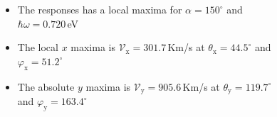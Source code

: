 \documentclass{beamer}
\begin{document}
\begin{frame}
\begin{columns}
{\begin{itemize}
\item The responses has a local maxima for $\alpha = 150^{\circ}$ and $\hbar
\omega = 0.720$\,eV

\item The local $x$ maxima is 
$\mathcal{V}_{\mathrm{x}} = 301.7 $\,Km/s at
$\theta_{\mathrm{x}} = 44.5^{\circ}$ and
$\varphi_{\mathrm{x}} = 51.2^{\circ}$

\item The absolute $y$ maxima is 
$\mathcal{V}_{\mathrm{y}} = 905.6$\,Km/s at 
$\theta_{\mathrm{y}} = 119.7^{\circ}$ and
$\varphi_{\mathrm{y}} = 163.4^{\circ}$

\end{itemize}

}

\begin{center}

\vspace{-8mm}
\begin{figure}[h!]
\end{figure}
\end{center}
\end{columns}
\end{frame}
\end{document}
